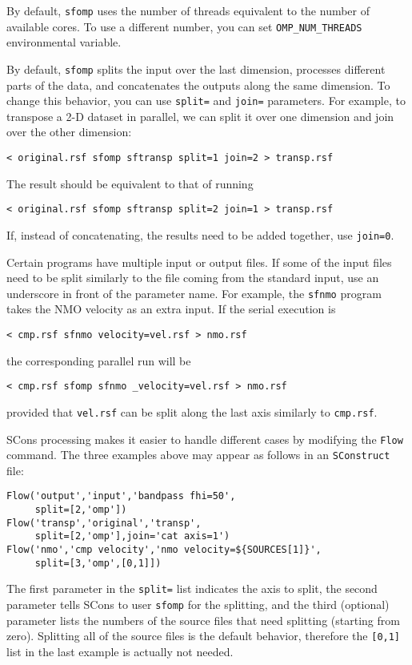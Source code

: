 By default, \texttt{sfomp} uses the number of threads equivalent to
the number of available cores. To use a different number, you can set
\texttt{OMP\_NUM\_THREADS} environmental variable.

By default, \texttt{sfomp} splits the input over the last dimension,
processes different parts of the data, and concatenates the outputs
along the same dimension. To change this behavior, you can use
\texttt{split=} and \texttt{join=} parameters. For example, to
transpose a 2-D dataset in parallel, we can split it over one
dimension and join over the other dimension:
\begin{verbatim}
< original.rsf sfomp sftransp split=1 join=2 > transp.rsf
\end{verbatim}
The result should be equivalent to that of running
\begin{verbatim}
< original.rsf sfomp sftransp split=2 join=1 > transp.rsf
\end{verbatim}
If, instead of concatenating, the results need to be added together,
use \texttt{join=0}.

Certain programs have multiple input or output files. If some of the
input files need to be split similarly to the file coming from the
standard input, use an underscore in front of the parameter name. For
example, the \texttt{sfnmo} program takes the NMO velocity as an extra
input. If the serial execution is
\begin{verbatim}
< cmp.rsf sfnmo velocity=vel.rsf > nmo.rsf
\end{verbatim}
the corresponding parallel run will be
\begin{verbatim}
< cmp.rsf sfomp sfnmo _velocity=vel.rsf > nmo.rsf
\end{verbatim}
provided that \texttt{vel.rsf} can be split along the last axis
similarly to \texttt{cmp.rsf}.

SCons processing makes it easier to handle different cases by
modifying the \texttt{Flow} command. The three examples above may
appear as follows in an \texttt{SConstruct} file:

\lstset{language=python,showstringspaces=false,frame=single}
\begin{lstlisting}
Flow('output','input','bandpass fhi=50',
     split=[2,'omp'])
Flow('transp','original','transp',
     split=[2,'omp'],join='cat axis=1')
Flow('nmo','cmp velocity','nmo velocity=${SOURCES[1]}',
     split=[3,'omp',[0,1]])
\end{lstlisting}

The first parameter in the \texttt{split=} list indicates the axis to
split, the second parameter tells SCons to user \texttt{sfomp} for the
splitting, and the third (optional) parameter lists the numbers of the
source files that need splitting (starting from zero). Splitting all
of the source files is the default behavior, therefore the
\texttt{[0,1]} list in the last example is actually not needed.

